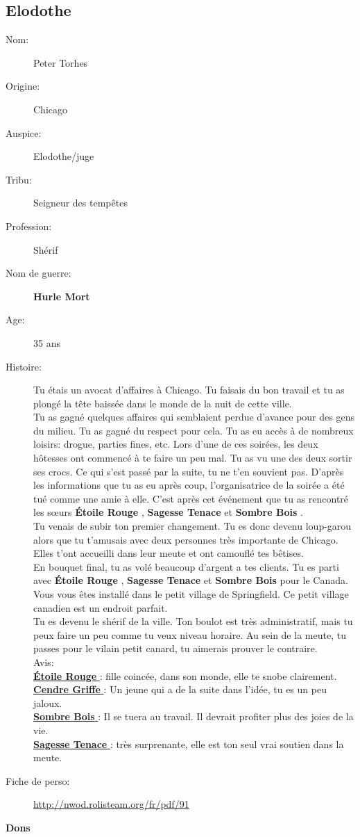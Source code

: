 \documentclass[oneside,12pt]{book}
\newcommand{\Lynn}{\textbf{Étoile Rouge} }
\newcommand{\Jessica}{\textbf{Sagesse Tenace} }
\newcommand{\Luke}{\textbf{Cendre Griffe} }
\newcommand{\Peter}{\textbf{Hurle Mort} }
\newcommand{\Leonard}{\textbf{Sombre Bois} }
\begin{document}
\begin{flushleft}
\section{Elodothe}
\begin{description}
\item[Nom:]{Peter Torhes}
\item[Origine:]{Chicago}
\item[Auspice:]{Elodothe/juge}
\item[Tribu:]{Seigneur des tempêtes}
\item[Profession:]{Shérif}
\item[Nom de guerre:]{\Peter}
\item[Age:]{35 ans}
\item[Histoire:]{
Tu étais un avocat d'affaires à Chicago. 
Tu faisais du bon travail et tu as plongé la tête baissée dans le monde de la nuit de cette ville.\\
Tu as gagné quelques affaires qui semblaient perdue d'avance pour des gens du milieu.
Tu as gagné du respect pour cela. Tu as eu accès à de nombreux loisirs: drogue, parties fines, etc. Lors d'une de ces soirées, les deux hôtesses ont commencé à te faire un peu mal. Tu as vu une des deux sortir ses crocs. Ce qui s'est passé par la suite, tu ne t'en souvient pas.  
D'après les informations que tu as eu après coup, l'organisatrice de la soirée a été tué comme une amie à elle. 
C'est après cet événement que tu as rencontré les sœurs \Lynn , \Jessica et \Leonard.\\
Tu venais de subir ton premier changement. Tu es donc devenu loup-garou alors que tu t'amusais avec deux personnes très importante de Chicago.
Elles t'ont accueilli dans leur meute et ont camouflé tes bêtises. \\
En bouquet final, tu as volé beaucoup d'argent a tes clients. 
Tu es parti avec \Lynn, \Jessica et \Leonard pour le Canada. Vous vous êtes installé dans le petit village de Springfield. Ce petit village canadien est un endroit parfait. \\
Tu es devenu le shérif de la ville. Ton boulot est très administratif, mais tu peux faire un peu comme tu veux niveau horaire. 
Au sein de la meute, tu passes pour le vilain petit canard, tu aimerais prouver le contraire. \\

Avis:\\
\underline{\Lynn} : fille coincée, dans son monde, elle te snobe clairement.\\
\underline{\Luke} : Un jeune qui a de la suite dans l'idée, tu es un peu jaloux.\\
\underline{\Leonard} : Il se tuera au travail. Il devrait profiter plus des joies de la vie.\\
\underline{\Jessica} : très surprenante, elle est ton seul vrai soutien dans la meute. \\
}
\item[Fiche de perso:]{\href{http://nwod.rolisteam.org/fr/pdf/91}{http://nwod.rolisteam.org/fr/pdf/91}}
\end{description}
\clearpage
\textbf{\large Dons} 
\vspace{0.5cm}


\end{flushleft}
\end{document}
